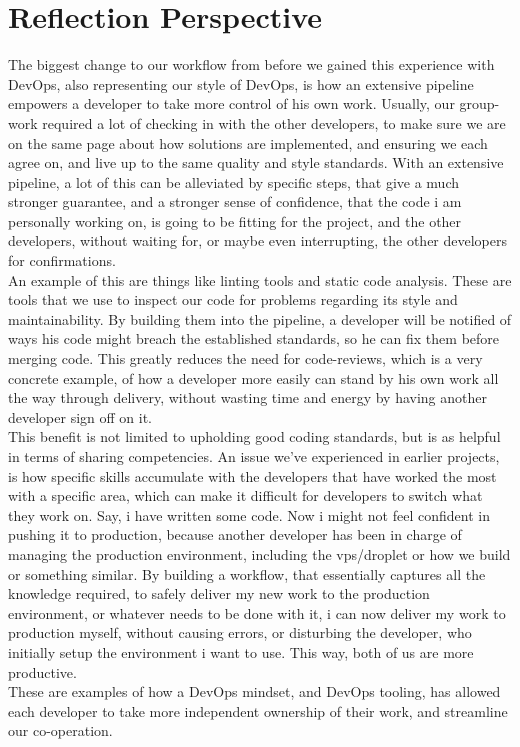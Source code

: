 \section{Reflection Perspective}

The biggest change to our workflow from before we gained this experience with DevOps, also representing our style of DevOps, is how an extensive pipeline empowers a developer to take more control of his own work. Usually, our group-work required a lot of checking in with the other developers, to make sure we are on the same page about how solutions are implemented, and ensuring we each agree on, and live up to the same quality and style standards. With an extensive pipeline, a lot of this can be alleviated by specific steps, that give a much stronger guarantee, and a stronger sense of confidence, that the code i am personally working on, is going to be fitting for the project, and the other developers, without waiting for, or maybe even interrupting, the other developers for confirmations. \\

An example of this are things like linting tools and static code analysis. These are tools that we use to inspect our code for problems regarding its style and maintainability. By building them into the pipeline, a developer will be notified of ways his code might breach the established standards, so he can fix them before merging code. This greatly reduces the need for code-reviews, which is a very concrete example, of how a developer more easily can stand by his own work all the way through delivery, without wasting time and energy by having another developer sign off on it. \\

This benefit is not limited to upholding good coding standards, but is as helpful in terms of sharing competencies. An issue we've experienced in earlier projects, is how specific skills accumulate with the developers that have worked the most with a specific area, which can make it difficult for developers to switch what they work on. Say, i have written some code. Now i might not feel confident in pushing it to production, because another developer has been in charge of managing the production environment, including the vps/droplet or how we build or something similar. By building a workflow, that essentially captures all the knowledge required, to safely deliver my new work to the production environment, or whatever needs to be done with it, i can now deliver my work to production myself, without causing errors, or disturbing the developer, who initially setup the environment i want to use. This way, both of us are more productive. \\

These are examples of how a DevOps mindset, and DevOps tooling, has allowed each developer to take more independent ownership of their work, and streamline our co-operation. 